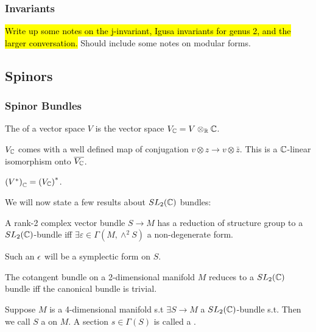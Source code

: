 \documentclass{article}
\begin{document}
\subsubsection{Invariants}
\hl{Write up some notes on the j-invariant, Igusa invariants for genus 2, and the larger conversation.} Should include some notes on modular forms. 

\subsection{Spinors}
\subsubsection{Spinor Bundles}
\begin{definition}
	The  of a vector space $V$ is the vector space $V_{\mathbb{C}} = V \otimes_{\mathbb{R}} \mathbb{C}$. 
\end{definition}
\begin{prop}
	$V_{\mathbb{C}}$ comes with a well defined map of conjugation $v \otimes z \to v \otimes \bar{z}$. This is a $\mathbb{C}$-linear isomorphism onto $\overline{V_{\mathbb{C}}}$. 
\end{prop}
\begin{lemma}
	$\left( V^\ast \right)_{\mathbb{C}} = \left( V_{\mathbb{C}} \right)^\ast$. 
\end{lemma}

We will now state a few results about $SL_2(\mathbb{C})$ bundles:
\begin{lemma}
	A rank-2 complex vector bundle $S \to M$ has a reduction of structure group to a $SL_2(\mathbb{C})$-bundle iff $\exists \varepsilon \in \Gamma(M,\wedge^2 S)$ a non-degenerate form. 
\end{lemma}

\begin{remark}
	Such an $\epsilon$ will be a symplectic form on $S$.
\end{remark}

\begin{corollary}
	The cotangent bundle on a 2-dimensional manifold $M$ reduces to a $SL_2(\mathbb{C})$ bundle iff the canonical bundle is trivial.  
\end{corollary}

\begin{definition}
	Suppose $M$ is a 4-dimensional manifold s.t $\exists S \to M$ a $SL_2(\mathbb{C})$-bundle s.t. 
Then we call $S$ a  on  $M$. A section $s \in \Gamma(S)$ is called a .   
\end{definition}
\end{document}
